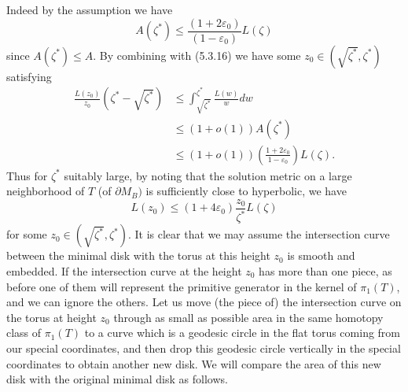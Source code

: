 Indeed by the assumption we have
$$
A(\zeta^{\ast})\leq
\frac{(1+2\varepsilon_0)}{(1-\varepsilon_0)}L(\zeta)
$$
since $A(\zeta^{\ast})\leq A$. By combining with (5.3.16) we have
some $z_0\in (\sqrt{\zeta^{\ast}},\zeta^{\ast})$ satisfying
\begin{align*}
\frac{L(z_0)}{z_0}\left(\zeta^{\ast}-\sqrt{\zeta^{\ast}}\right)&  \leq
\int_{\sqrt{\zeta^{\ast}}}^{\zeta^{\ast}} \frac{L(w)}{w}dw \\
&  \leq  (1+o(1))A(\zeta^{\ast}) \\
&  \leq
(1+o(1))\left(\frac{1+2\varepsilon_0}{1-\varepsilon_0}\right)L(\zeta).
\end{align*}
Thus for $\zeta^{\ast}$ suitably large, by noting that the
solution metric on a large neighborhood of $T$ (of $\partial
{M}_B)$ is sufficiently close to hyperbolic, we have \begin{equation}
L(z_0)\leq (1+4\varepsilon_0)\frac{z_0}{\zeta^{\ast}}L(\zeta)
\end{equation} for some $z_0\in (\sqrt{\zeta^{\ast}},\zeta^{\ast})$. It is
clear that we may assume the intersection curve between the
minimal disk with the torus at this height $z_0$ is smooth and
embedded. If the intersection curve at the height $z_0$ has more
than one piece, as before one of them will represent the primitive
generator in the kernel of $\pi_1(T)$, and we can ignore the
others. Let us move (the piece of) the intersection curve on the
torus at height $z_0$ through as small as possible area in the
same homotopy class of $\pi_1(T)$ to a curve which is a geodesic
circle in the flat torus coming from our special coordinates, and
then drop this geodesic circle vertically in the special
coordinates to obtain another new disk. We will compare the area
of this new disk with the original minimal disk as follows.

